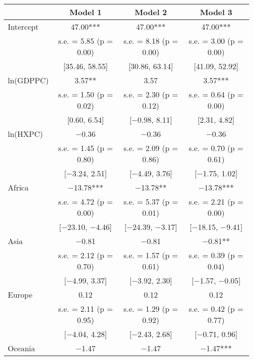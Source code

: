 \documentclass[
]{article}
\begin{document}
\begin{table}
\centering
\begin{tabular}[t]{lccc}
\toprule
  & Model 1 & Model 2 & Model 3\\
\midrule
Intercept & \num{47.00}*** & \num{47.00}*** & \num{47.00}***\\
 & s.e. = \num{5.85} (p = \num{0.00}) & s.e. = \num{8.18} (p = \num{0.00}) & s.e. = \num{3.00} (p = \num{0.00})\\
 & {}[\num{35.46}, \num{58.55}] & {}[\num{30.86}, \num{63.14}] & {}[\num{41.09}, \num{52.92}]\\
ln(GDPPC) & \num{3.57}** & \num{3.57} & \num{3.57}***\\
 & s.e. = \num{1.50} (p = \num{0.02}) & s.e. = \num{2.30} (p = \num{0.12}) & s.e. = \num{0.64} (p = \num{0.00})\\
 & {}[\num{0.60}, \num{6.54}] & {}[\num{-0.98}, \num{8.11}] & {}[\num{2.31}, \num{4.82}]\\
ln(HXPC) & \num{-0.36} & \num{-0.36} & \num{-0.36}\\
 & s.e. = \num{1.45} (p = \num{0.80}) & s.e. = \num{2.09} (p = \num{0.86}) & s.e. = \num{0.70} (p = \num{0.61})\\
 & {}[\num{-3.24}, \num{2.51}] & {}[\num{-4.49}, \num{3.76}] & {}[\num{-1.75}, \num{1.02}]\\
Africa & \num{-13.78}*** & \num{-13.78}** & \num{-13.78}***\\
 & s.e. = \num{4.72} (p = \num{0.00}) & s.e. = \num{5.37} (p = \num{0.01}) & s.e. = \num{2.21} (p = \num{0.00})\\
 & {}[\num{-23.10}, \num{-4.46}] & {}[\num{-24.39}, \num{-3.17}] & {}[\num{-18.15}, \num{-9.41}]\\
Asia & \num{-0.81} & \num{-0.81} & \num{-0.81}**\\
 & s.e. = \num{2.12} (p = \num{0.70}) & s.e. = \num{1.57} (p = \num{0.61}) & s.e. = \num{0.39} (p = \num{0.04})\\
 & {}[\num{-4.99}, \num{3.37}] & {}[\num{-3.92}, \num{2.30}] & {}[\num{-1.57}, \num{-0.05}]\\
Europe & \num{0.12} & \num{0.12} & \num{0.12}\\
 & s.e. = \num{2.11} (p = \num{0.95}) & s.e. = \num{1.29} (p = \num{0.92}) & s.e. = \num{0.42} (p = \num{0.77})\\
 & {}[\num{-4.04}, \num{4.28}] & {}[\num{-2.43}, \num{2.68}] & {}[\num{-0.71}, \num{0.96}]\\
Oceania & \num{-1.47} & \num{-1.47} & \num{-1.47}***\\

\end{tabular}
\end{table}
\end{document}
